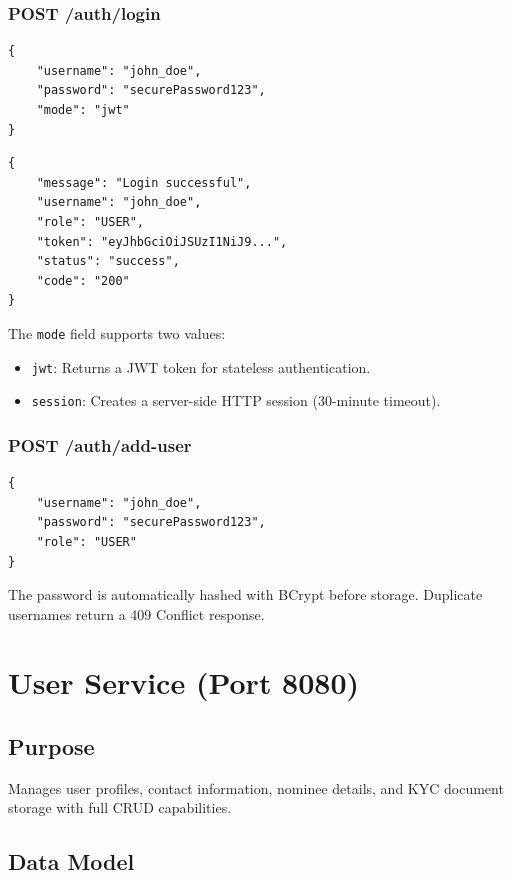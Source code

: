 \documentclass[12pt,a4paper]{report}
\begin{document}
\subsubsection{POST /auth/login}
\begin{lstlisting}[style=jsonstyle, caption={Login Request}]
{
    "username": "john_doe",
    "password": "securePassword123",
    "mode": "jwt"
}
\end{lstlisting}

\begin{lstlisting}[style=jsonstyle, caption={Login Response (Success)}]
{
    "message": "Login successful",
    "username": "john_doe",
    "role": "USER",
    "token": "eyJhbGciOiJSUzI1NiJ9...",
    "status": "success",
    "code": "200"
}
\end{lstlisting}

The \texttt{mode} field supports two values:
\begin{itemize}
    \item \texttt{jwt}: Returns a JWT token for stateless authentication.
    \item \texttt{session}: Creates a server-side HTTP session (30-minute timeout).
\end{itemize}

\subsubsection{POST /auth/add-user}
\begin{lstlisting}[style=jsonstyle, caption={Register Request}]
{
    "username": "john_doe",
    "password": "securePassword123",
    "role": "USER"
}
\end{lstlisting}

The password is automatically hashed with BCrypt before storage. Duplicate usernames return a 409 Conflict response.

\section{User Service (Port 8080)}

\subsection{Purpose}
Manages user profiles, contact information, nominee details, and KYC document storage with full CRUD capabilities.

\subsection{Data Model}
\end{document}
